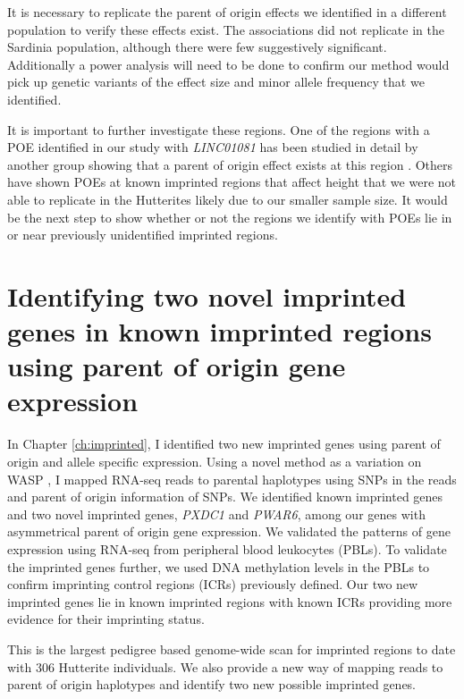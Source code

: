 It is necessary to replicate the parent of origin effects we identified in a different population to verify these effects exist. The associations did not replicate in the Sardinia population, although there were few suggestively significant. Additionally a power analysis will need to be done to confirm our method would pick up genetic variants of the effect size and minor allele frequency that we identified.

It is important to further investigate these regions. One of the regions with a POE identified in our study with \emph{LINC01081} has been studied in detail by another group showing that a parent of origin effect exists at this region \cite{Szafranski:2016fz}. Others have shown POEs at known imprinted regions that affect height\cite{Benonisdottir:2016dz,Zoledziewska:2015do} that we were not able to replicate in the Hutterites likely due to our smaller sample size. It would be the next step to show whether or not the regions we identify with POEs lie in or near previously unidentified imprinted regions.
 
\section{Identifying two novel imprinted genes in known imprinted regions using parent of origin gene expression}

In Chapter \ref{ch:imprinted}, I identified two new imprinted genes using parent of origin and allele specific expression. Using a novel method as a variation on WASP \cite{vandeGeijn:2015hi}, I mapped RNA-seq reads to parental haplotypes using SNPs in the reads and parent of origin information of SNPs. We identified known imprinted genes and two novel imprinted genes, \emph{PXDC1} and \emph{PWAR6}, among our genes with asymmetrical parent of origin gene expression. We validated the patterns of gene expression using RNA-seq from peripheral blood leukocytes (PBLs). To validate the imprinted genes further, we used DNA methylation levels in the PBLs to confirm imprinting control regions (ICRs) previously defined\cite{Joshi:2016bb,Court:2014kc}. Our two new imprinted genes lie in known imprinted regions with known ICRs providing more evidence for their imprinting status.
 
This is the largest pedigree based genome-wide scan for imprinted regions to date with 306 Hutterite individuals. We also provide a new way of mapping reads to parent of origin haplotypes and identify two new possible imprinted genes.

